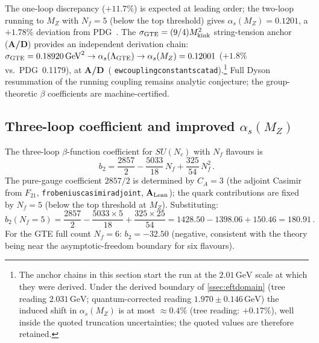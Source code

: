 \documentclass[11pt]{article}
\theoremstyle{remark}
\newcommand{\Ftwentyone}{F_{21}}
\newcommand{\lean}[1]{%
  \penalty-100
  \begingroup\def\_{\textunderscore\allowbreak}\texttt{#1}\endgroup}
\newcommand{\CatAL}{\ensuremath{\textbf{A}_{\rm Lean}}}
\newcommand{\CatAD}{\textbf{A/D}}
\begin{document}
The one-loop discrepancy ($+11.7\%$) is expected at leading order; the
two-loop running to $M_Z$ with $N_f = 5$ (below the top threshold) gives
$\alpha_s(M_Z) = 0.1201$, a $+1.78\%$ deviation from PDG~\cite{PDG2022}.
The $\sigma_{\rm GTE} = (9/4)M_{\rm kink}^2$ string-tension anchor (\CatAD) provides an
independent derivation chain: $\sigma_{\rm GTE} = 0.18920\,\mathrm{GeV}^2 \to
\alpha_s(\Lambda_{\rm GTE}) \to \alpha_s(M_Z) = 0.12001$ ($+1.8\%$ vs.\ PDG~0.1179),
at \CatAD\ (\lean{ew\_coupling\_constants\_catad}).\footnote{\label{fn:alphas_anchor}The
anchor chains in this section start the run at the $2.01\,\mathrm{GeV}$ scale at
which they were derived.
Under the derived boundary of \cref{ssec:eftdomain} (tree reading
$2.031\,\mathrm{GeV}$; quantum-corrected reading $1.970 \pm 0.146\,\mathrm{GeV}$)
the induced shift in $\alpha_s(M_Z)$ is at most ${\approx}0.4\%$ (tree reading:
$+0.17\%$), well inside the quoted truncation uncertainties; the quoted values
are therefore retained.}
Full Dyson resummation of the running coupling remains analytic conjecture;
the group-theoretic $\beta$ coefficients are machine-certified.

\subsection{Three-loop coefficient and improved \texorpdfstring{$\alpha_s(M_Z)$}{alphas(MZ)}}
\label{ssec:threeloop}

The three-loop $\beta$-function coefficient for $SU(N_c)$ with $N_f$ flavours
is~\cite{TarasovVladimirovZharkov1980,LarinVermaseren1993}
\begin{equation}
  b_2 = \frac{2857}{2} - \frac{5033}{18}\,N_f + \frac{325}{54}\,N_f^2\,.
  \label{eq:b2formula}
\end{equation}
The pure-gauge coefficient $2857/2$ is determined by $C_A = 3$ (the adjoint Casimir
from $\Ftwentyone$, \lean{frobenius\_casimir\_adjoint}, \CatAL{}); the quark contributions are fixed by $N_f = 5$
(below the top threshold at $M_Z$).
Substituting:
\begin{equation}
  b_2\!\left(N_f = 5\right)
    = \frac{2857}{2} - \frac{5033 \times 5}{18} + \frac{325 \times 25}{54}
    = 1428.50 - 1398.06 + 150.46
    = 180.91\,.
  \label{eq:b2}
\end{equation}
For the GTE full count $N_f = 6$: $b_2 = -32.50$ (negative, consistent with
the theory being near the asymptotic-freedom boundary for six flavours).
\end{document}
